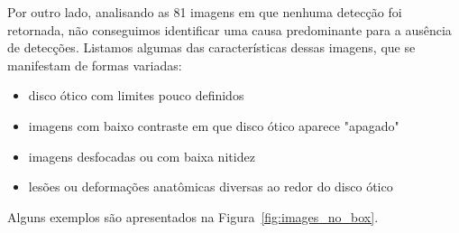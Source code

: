 \documentclass[12pt]{article}
\begin{document}
Por outro lado, analisando as 81 imagens em que nenhuma detecção foi retornada, não conseguimos identificar uma causa predominante para a ausência de detecções. Listamos algumas das características dessas imagens, que se manifestam de formas variadas:

\begin{itemize}[noitemsep,topsep=0pt]
    \item disco ótico com limites pouco definidos
    \item imagens com baixo contraste em que disco ótico aparece "apagado"
    \item imagens desfocadas ou com baixa nitidez
    \item lesões ou deformações anatômicas diversas ao redor do disco ótico
\end{itemize}

Alguns exemplos são apresentados na Figura~\ref{fig:images_no_box}.
\end{document}
